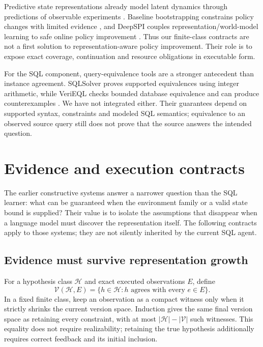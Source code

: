 \documentclass[10pt,twocolumn]{article}
\begin{document}
Predictive state representations already model latent dynamics through
predictions of observable experiments \citep{singh2004psr}. Baseline
bootstrapping constrains policy changes with limited evidence
\citep{laroche2019spibb}, and DeepSPI couples representation/world-model
learning to safe online policy improvement \citep{delgrange2026deepspi}. Thus
our finite-class contracts are not a first solution to representation-aware
policy improvement. Their role is to expose exact coverage, continuation and
resource obligations in executable form.

For the SQL component, query-equivalence tools are a stronger antecedent than
instance agreement. SQLSolver proves supported equivalences using integer
arithmetic, while VeriEQL checks bounded database equivalence and can produce
counterexamples \citep{ding2023sqlsolver,he2024verieql}. We have not integrated
either. Their guarantees depend on supported syntax, constraints and modeled
SQL semantics; equivalence to an observed source query still does not prove
that the source answers the intended question.

\section{Evidence and execution contracts}\label{sec:contracts}
The earlier constructive systems answer a narrower question than the SQL
learner: what can be guaranteed when the environment family or a valid state
bound is supplied? Their value is to isolate the assumptions that disappear
when a language model must discover the representation itself. The following
contracts apply to those systems; they are not silently inherited by the
current SQL agent.

\subsection{Evidence must survive representation growth}
For a hypothesis class $\mathcal H$ and exact executed observations $E$, define
\begin{equation}
 \mathcal V(\mathcal H,E)=\{h\in\mathcal H:h\text{ agrees with every }e\in E\}.
\end{equation}
In a fixed finite class, keep an observation as a compact witness only when it
strictly shrinks the current version space. Induction gives the same final
version space as retaining every constraint, with at most
$|\mathcal H|-|\mathcal V|$ such witnesses. This equality does not require
realizability; retaining the true hypothesis additionally requires correct
feedback and its initial inclusion.
\end{document}

